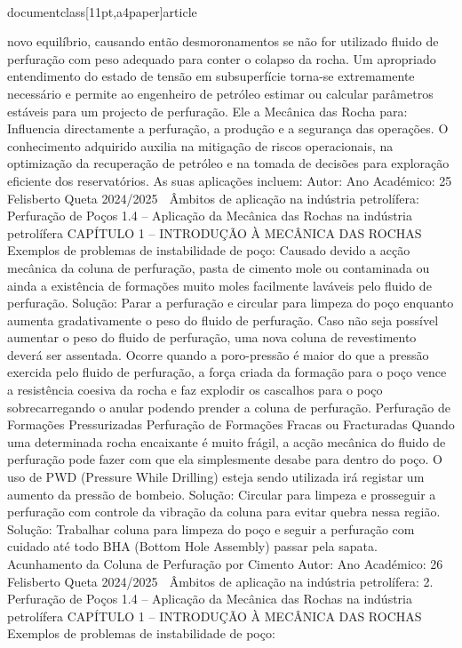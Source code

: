 \\documentclass[11pt,a4paper]{article}
\begin{document}
novo equilíbrio, causando então desmoronamentos se não for utilizado fluido de perfuração com peso adequado para conter 
o colapso da rocha. Um apropriado entendimento do estado de tensão em subsuperfície torna-se extremamente necessário 
e permite ao engenheiro de petróleo estimar ou calcular parâmetros estáveis para um projecto de perfuração. Ele a 
Mecânica das Rocha para:
Influencia directamente a perfuração, a produção e a segurança das operações. O conhecimento adquirido auxilia
na mitigação de riscos operacionais, na optimização da recuperação de petróleo e na tomada de decisões para
exploração eficiente dos reservatórios. As suas aplicações incluem:
Autor:
Ano Académico:
25
Felisberto Queta
2024/2025

 Âmbitos de aplicação na indústria petrolífera:
 Perfuração de Poços
1.4 – Aplicação da Mecânica das Rochas na indústria petrolífera
CAPÍTULO 1 
–
 INTRODUÇÃO À MECÂNICA DAS ROCHAS
Exemplos de problemas de instabilidade de poço:
Causado devido a acção mecânica 
da coluna de perfuração, pasta de 
cimento mole ou contaminada ou 
ainda a existência de formações 
muito moles facilmente laváveis pelo 
fluido de perfuração.
Solução: Parar a perfuração e circular 
para limpeza do poço enquanto aumenta 
gradativamente o peso do fluido de 
perfuração. Caso não seja possível 
aumentar o peso do fluido de perfuração, 
uma nova coluna de revestimento deverá 
ser assentada.
Ocorre quando a poro-pressão é maior do 
que a pressão exercida pelo fluido de 
perfuração, a força criada da formação 
para o poço vence a resistência coesiva da 
rocha e faz explodir os cascalhos para o 
poço sobrecarregando o anular podendo 
prender a coluna de perfuração.
Perfuração de
Formações
Pressurizadas
Perfuração de
Formações
Fracas ou
Fracturadas
Quando uma determinada rocha encaixante 
é muito frágil, a acção mecânica do fluido de 
perfuração pode fazer com que ela 
simplesmente desabe para dentro do poço. 
O uso de PWD (Pressure While Drilling) 
esteja sendo utilizada irá registar um 
aumento da pressão de bombeio.
Solução: Circular para limpeza e prosseguir 
a perfuração com controle da vibração da 
coluna para evitar quebra nessa região.
Solução: Trabalhar coluna para 
limpeza do poço e seguir a 
perfuração com cuidado até todo 
BHA (Bottom Hole Assembly) passar 
pela sapata.
Acunhamento
da Coluna de
Perfuração por
Cimento 
Autor:
Ano Académico:
26
Felisberto Queta
2024/2025

 Âmbitos de aplicação na indústria petrolífera:
2. Perfuração de Poços
1.4 – Aplicação da Mecânica das Rochas na indústria petrolífera
CAPÍTULO 1 
–
 INTRODUÇÃO À MECÂNICA DAS ROCHAS
Exemplos de problemas de instabilidade de poço:
\end{document}
